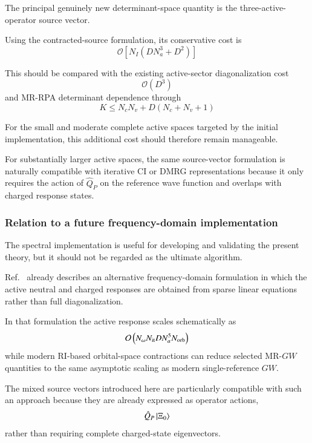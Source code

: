 \documentclass[aip,jcp,reprint,noshowkeys,superscriptaddress]{revtex4-1}
\begin{document}
The principal genuinely new determinant-space quantity is the
three-active-operator source vector.

Using the contracted-source formulation, its conservative cost is
\begin{equation}
  \mathcal O
  \left[
    N_I(DN_a^3+D^2)
  \right]
\end{equation}

This should be compared with the existing active-sector diagonalization
cost
\begin{equation}
  \mathcal O(D^3)
\end{equation}
and MR-RPA determinant dependence through
\begin{equation}
  K
  \le
  N_cN_v
  +
  D(N_c+N_v+1)
\end{equation}

For the small and moderate complete active spaces targeted by the
initial implementation, this additional cost should therefore remain
manageable.

For substantially larger active spaces, the same source-vector
formulation is naturally compatible with iterative CI or DMRG
representations because it only requires the action of
$\hat Q_P$ on the reference wave function and overlaps with charged
response states.


\subsubsection{Relation to a future frequency-domain implementation}

The spectral implementation is useful for developing and validating
the present theory, but it should not be regarded as the ultimate
algorithm.

Ref.~\cite{WangFangLi2026} already describes an alternative
frequency-domain formulation in which the active neutral and charged
responses are obtained from sparse linear equations rather than full
diagonalization.

In that formulation the active response scales schematically as
\begin{equation}
  \mathcal O
  \left(
    N_\omega
    N_{\rm it}
    D
    N_a^5
    N_{\rm orb}
  \right)
\end{equation}
while modern RI-based orbital-space contractions can reduce selected
MR-$GW$ quantities to the same asymptotic scaling as modern
single-reference $GW$.

The mixed source vectors introduced here are particularly compatible
with such an approach because they are already expressed as operator
actions,
\begin{equation}
  \hat Q_P
  \ket{\Xi_0}
\end{equation}
rather than requiring complete charged-state eigenvectors.
\end{document}
